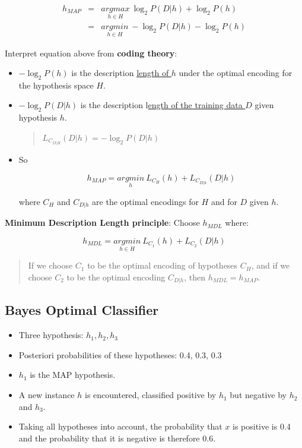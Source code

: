 \begin{equation*}
\begin{aligned}
  h_{MAP}&=&\underset{h\in H}{argmax}\ \log_2P(D|h)+\log_2P(h)\\
  &=&\underset{h\in H}{argmin}\ -\log_2P(D|h)-\log_2P(h)
\end{aligned}
\end{equation*}


Interpret equation above from \textbf{coding theory}:

\begin{itemize}
\item
  \(-\log_2P(h)\) is the description \underline{length of \(h\)} under the
  optimal encoding for the hypothesis space \(H\).
\item
  \(-\log_2P(D|h)\) is the description l\underline{ength of the training data
  \(D\)} given hypothesis \(h\).

  \begin{quote}
  \(L_{C_{D|H}}(D|h)=-\log_2P(D|h)\)
  \end{quote}
\item
  So

  \[h_{MAP}=\underset{h}{argmin}\ L_{C_H}(h)+L_{C_{D|h}}(D|h)\]

  where \(C_H\) and \(C_{D|h}\) are the optimal encodings for \(H\) and
  for \(D\) given \(h\).
\end{itemize}

\textbf{Minimum Description Length principle}: Choose \(h_{MDL}\) where:

\[h_{MDL}=\underset{h\in H}{argmin}\ L_{C_1}(h)+L_{C_2}(D|h)\]

\begin{quote}
If we choose \(C_1\) to be the optimal encoding of hypotheses \(C_H\),
and if we choose \(C_2\) to be the optimal encoding \(C_{D|h}\), then
\(h_{MDL}=h_{MAP}\).
\end{quote}

\hypertarget{bayes-optimal-classifier}{%
\subsection{Bayes Optimal Classifier}\label{bayes-optimal-classifier}}

\begin{itemize}
\item
  Three hypothesis: \(h_1,h_2,h_3\)
\item
  Posteriori probabilities of these hypotheses: 0.4, 0.3, 0.3
\item
  \(h_1\) is the MAP hypothesis.
\item
  A new instance \(h\) is encountered, classified positive by \(h_1\)
  but negative by \(h_2\) and \(h_3\).
\item
  Taking all hypotheses into account, the probability that \(x\) is
  positive is 0.4 and the probability that it is negative is therefore
  0.6.
\end{itemize}

